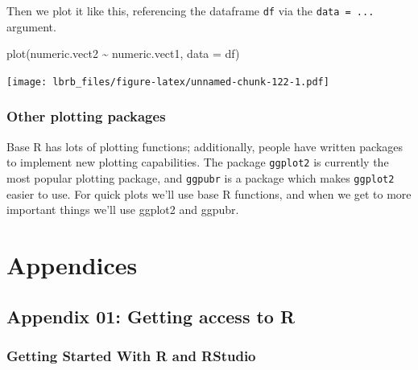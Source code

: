 \documentclass[
]{book}
\newenvironment{Shaded}{\begin{snugshade}}{\end{snugshade}}
\newcommand{\AttributeTok}[1]{\textcolor[rgb]{0.77,0.63,0.00}{#1}}
\newcommand{\FunctionTok}[1]{\textcolor[rgb]{0.00,0.00,0.00}{#1}}
\newcommand{\NormalTok}[1]{#1}
\newcommand{\SpecialCharTok}[1]{\textcolor[rgb]{0.00,0.00,0.00}{#1}}
\begin{document}
Then we plot it like this, referencing the dataframe \texttt{df} via the \texttt{data\ =\ ...} argument.

\begin{Shaded}
\begin{Highlighting}[]
\FunctionTok{plot}\NormalTok{(numeric.vect2 }\SpecialCharTok{\textasciitilde{}}\NormalTok{ numeric.vect1, }\AttributeTok{data =}\NormalTok{ df)}
\end{Highlighting}
\end{Shaded}

\texttt{[image: lbrb\_files/figure-latex/unnamed-chunk-122-1.pdf]}

\hypertarget{other-plotting-packages}{%
\section{Other plotting packages}\label{other-plotting-packages}}

Base R has lots of plotting functions; additionally, people have written packages to implement new plotting capabilities. The package \texttt{ggplot2} is currently the most popular plotting package, and \texttt{ggpubr} is a package which makes \texttt{ggplot2} easier to use. For quick plots we'll use base R functions, and when we get to more important things we'll use ggplot2 and ggpubr.

\hypertarget{part-appendices}{%
\part{Appendices}\label{part-appendices}}

\hypertarget{section}{%
\subsection*{}\label{section}}

\hypertarget{appendix-01-getting-access-to-r}{%
\chapter*{Appendix 01: Getting access to R}\label{appendix-01-getting-access-to-r}}

\hypertarget{getting-started-with-r-and-rstudio}{%
\section{Getting Started With R and RStudio}\label{getting-started-with-r-and-rstudio}}
\end{document}
